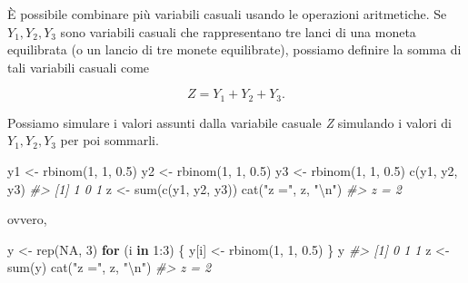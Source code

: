 \documentclass[
  11pt,
]{krantz}
\makeatletter
\newenvironment{Shaded}{\begin{snugshade}}{\end{snugshade}}
\newcommand{\CommentTok}[1]{\textcolor[rgb]{0.37,0.37,0.37}{\textit{#1}}}
\newcommand{\ConstantTok}[1]{\textcolor[rgb]{0,0,0}{#1}}
\newcommand{\ControlFlowTok}[1]{\textcolor[rgb]{0.27,0.27,0.27}{\textbf{#1}}}
\newcommand{\DecValTok}[1]{\textcolor[rgb]{0.06,0.06,0.06}{#1}}
\newcommand{\FloatTok}[1]{\textcolor[rgb]{0.06,0.06,0.06}{#1}}
\newcommand{\FunctionTok}[1]{\textcolor[rgb]{0,0,0}{#1}}
\newcommand{\NormalTok}[1]{#1}
\newcommand{\OtherTok}[1]{\textcolor[rgb]{0.37,0.37,0.37}{#1}}
\newcommand{\SpecialCharTok}[1]{\textcolor[rgb]{0,0,0}{#1}}
\newcommand{\StringTok}[1]{\textcolor[rgb]{0.5,0.5,0.5}{#1}}
\newenvironment{kframe}{%
\medskip{}
\setlength{\fboxsep}{.8em}
 \def\at@end@of@kframe{}%
 \ifinner\ifhmode%
  \def\at@end@of@kframe{\end{minipage}}%
  \begin{minipage}{\columnwidth}%
 \fi\fi%
 \def\FrameCommand##1{\hskip\@totalleftmargin \hskip-\fboxsep
 \colorbox{shadecolor}{##1}\hskip-\fboxsep
     \hskip-\linewidth \hskip-\@totalleftmargin \hskip\columnwidth}%
 \MakeFramed {\advance\hsize-\width
   \@totalleftmargin\z@ \linewidth\hsize
   \@setminipage}}%
 {\par\unskip\endMakeFramed%
 \at@end@of@kframe}
\renewenvironment{Shaded}{\begin{kframe}}{\end{kframe}}
\theoremstyle{definition}
\theoremstyle{definition}
\theoremstyle{definition}
\theoremstyle{definition}
\theoremstyle{remark}
\makeatother
\begin{document}
È possibile combinare più variabili casuali usando le operazioni aritmetiche. Se \(Y_1 , Y_2, Y_3\) sono variabili casuali che rappresentano tre lanci di una moneta equilibrata (o un lancio di tre monete equilibrate), possiamo definire la somma di tali variabili casuali come

\[
Z = Y_1 + Y_2 + Y_3.
\]

Possiamo simulare i valori assunti dalla variabile casuale \emph{Z} simulando i valori di \(Y_1, Y_2, Y_3\) per poi sommarli.

\begin{Shaded}
\begin{Highlighting}[]
\NormalTok{y1 }\OtherTok{\textless{}{-}} \FunctionTok{rbinom}\NormalTok{(}\DecValTok{1}\NormalTok{, }\DecValTok{1}\NormalTok{, }\FloatTok{0.5}\NormalTok{)}
\NormalTok{y2 }\OtherTok{\textless{}{-}} \FunctionTok{rbinom}\NormalTok{(}\DecValTok{1}\NormalTok{, }\DecValTok{1}\NormalTok{, }\FloatTok{0.5}\NormalTok{)}
\NormalTok{y3 }\OtherTok{\textless{}{-}} \FunctionTok{rbinom}\NormalTok{(}\DecValTok{1}\NormalTok{, }\DecValTok{1}\NormalTok{, }\FloatTok{0.5}\NormalTok{)}
\FunctionTok{c}\NormalTok{(y1, y2, y3)}
\CommentTok{\#\textgreater{} [1] 1 0 1}
\NormalTok{z }\OtherTok{\textless{}{-}} \FunctionTok{sum}\NormalTok{(}\FunctionTok{c}\NormalTok{(y1, y2, y3))}
\FunctionTok{cat}\NormalTok{(}\StringTok{"z ="}\NormalTok{, z, }\StringTok{"}\SpecialCharTok{\textbackslash{}n}\StringTok{"}\NormalTok{)}
\CommentTok{\#\textgreater{} z = 2}
\end{Highlighting}
\end{Shaded}

ovvero,

\begin{Shaded}
\begin{Highlighting}[]
\NormalTok{y }\OtherTok{\textless{}{-}} \FunctionTok{rep}\NormalTok{(}\ConstantTok{NA}\NormalTok{, }\DecValTok{3}\NormalTok{)}
\ControlFlowTok{for}\NormalTok{ (i }\ControlFlowTok{in} \DecValTok{1}\SpecialCharTok{:}\DecValTok{3}\NormalTok{) \{}
\NormalTok{  y[i] }\OtherTok{\textless{}{-}} \FunctionTok{rbinom}\NormalTok{(}\DecValTok{1}\NormalTok{, }\DecValTok{1}\NormalTok{, }\FloatTok{0.5}\NormalTok{)}
\NormalTok{\}}
\NormalTok{y}
\CommentTok{\#\textgreater{} [1] 0 1 1}
\NormalTok{z }\OtherTok{\textless{}{-}} \FunctionTok{sum}\NormalTok{(y)}
\FunctionTok{cat}\NormalTok{(}\StringTok{"z ="}\NormalTok{, z, }\StringTok{"}\SpecialCharTok{\textbackslash{}n}\StringTok{"}\NormalTok{)}
\CommentTok{\#\textgreater{} z = 2}
\end{Highlighting}
\end{Shaded}
\end{document}

